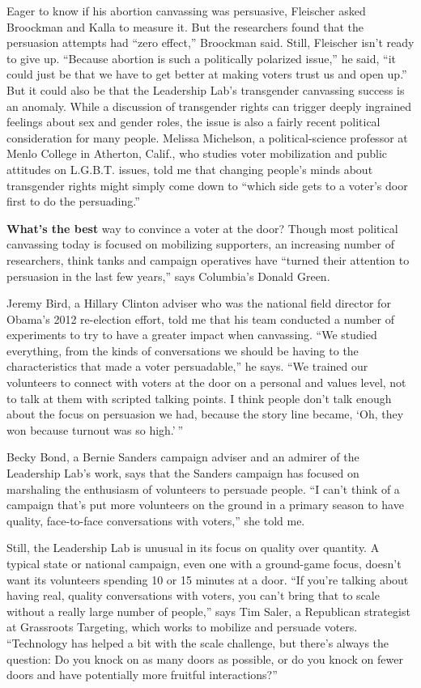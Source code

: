 Eager to know if his abortion canvassing was persuasive, Fleischer asked
Broockman and Kalla to measure it. But the researchers found that the
persuasion attempts had ``zero effect,'' Broockman said. Still,
Fleischer isn't ready to give up. ``Because abortion is such a
politically polarized issue,'' he said, ``it could just be that we have
to get better at making voters trust us and open up.'' But it could also
be that the Leadership Lab's transgender canvassing success is an
anomaly. While a discussion of transgender rights can trigger deeply
ingrained feelings about sex and gender roles, the issue is also a
fairly recent political consideration for many people. Melissa
Michelson, a political-science professor at Menlo College in Atherton,
Calif., who studies voter mobilization and public attitudes on L.G.B.T.
issues, told me that changing people's minds about transgender rights
might simply come down to ``which side gets to a voter's door first to
do the persuading.''

\textbf{What's the best} way to convince a voter at the door? Though
most political canvassing today is focused on mobilizing supporters, an
increasing number of researchers, think tanks and campaign operatives
have ``turned their attention to persuasion in the last few years,''
says Columbia's Donald Green.

Jeremy Bird, a Hillary Clinton adviser who was the national field
director for Obama's 2012 re-election effort, told me that his team
conducted a number of experiments to try to have a greater impact when
canvassing. ``We studied everything, from the kinds of conversations we
should be having to the characteristics that made a voter persuadable,''
he says. ``We trained our volunteers to connect with voters at the door
on a personal and values level, not to talk at them with scripted
talking points. I think people don't talk enough about the focus on
persuasion we had, because the story line became, `Oh, they won because
turnout was so high.' ''

Becky Bond, a Bernie Sanders campaign adviser and an admirer of the
Leadership Lab's work, says that the Sanders campaign has focused on
marshaling the enthusiasm of volunteers to persuade people. ``I can't
think of a campaign that's put more volunteers on the ground in a
primary season to have quality, face-to-face conversations with
voters,'' she told me.

Still, the Leadership Lab is unusual in its focus on quality over
quantity. A typical state or national campaign, even one with a
ground-game focus, doesn't want its volunteers spending 10 or 15 minutes
at a door. ``If you're talking about having real, quality conversations
with voters, you can't bring that to scale without a really large number
of people,'' says Tim Saler, a Republican strategist at Grassroots
Targeting, which works to mobilize and persuade voters. ``Technology has
helped a bit with the scale challenge, but there's always the question:
Do you knock on as many doors as possible, or do you knock on fewer
doors and have potentially more fruitful interactions?''

